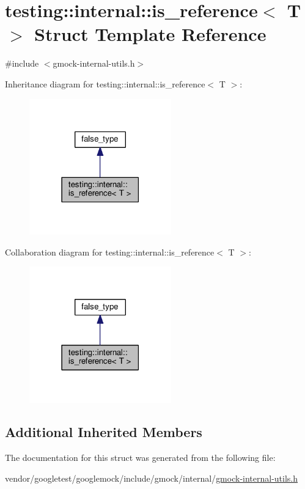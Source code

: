 \hypertarget{structtesting_1_1internal_1_1is__reference}{}\section{testing\+:\+:internal\+:\+:is\+\_\+reference$<$ T $>$ Struct Template Reference}
\label{structtesting_1_1internal_1_1is__reference}


{\ttfamily \#include $<$gmock-\/internal-\/utils.\+h$>$}



Inheritance diagram for testing\+:\+:internal\+:\+:is\+\_\+reference$<$ T $>$\+:\nopagebreak
\begin{figure}[H]
\begin{center}
\leavevmode
\includegraphics[width=174pt]{structtesting_1_1internal_1_1is__reference__inherit__graph}
\end{center}
\end{figure}


Collaboration diagram for testing\+:\+:internal\+:\+:is\+\_\+reference$<$ T $>$\+:\nopagebreak
\begin{figure}[H]
\begin{center}
\leavevmode
\includegraphics[width=174pt]{structtesting_1_1internal_1_1is__reference__coll__graph}
\end{center}
\end{figure}
\subsection*{Additional Inherited Members}


The documentation for this struct was generated from the following file\+:\begin{DoxyCompactItemize}
\item 
vendor/googletest/googlemock/include/gmock/internal/\hyperlink{gmock-internal-utils_8h}{gmock-\/internal-\/utils.\+h}\end{DoxyCompactItemize}

